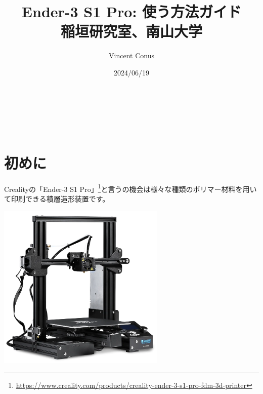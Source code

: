 \documentclass[10pt,a4paper,onecolumn,notitlepage,oneside,dvipdfmx]{article}
\author{Vincent Conus}
\date{2024/06/19}
\title{Ender-3 S1 Pro: 使う方法ガイド\\\medskip
\large 稲垣研究室、南山大学}
\makeatletter
\renewcommand{\maketitle}{%
\begin{center}{\Large \@title}\end{center}%
\begin{flushright}\@author\\ \@date\end{flushright}%
\hrulefill\\}
\makeatother
\begin{document}
\maketitle
\tableofcontents

\section{初めに}
\label{sec:org51cc4ac}
Crealityの「Ender-3 S1 Pro」\footnote{\url{https://www.creality.com/products/creality-ender-3-s1-pro-fdm-3d-printer}}と言うの機会は様々な種類のポリマー材料を用いて印刷できる積層造形装置です。

\begin{center}
\includegraphics[width=0.6\textwidth]{img/ender3.png}
\end{center}
\end{document}
